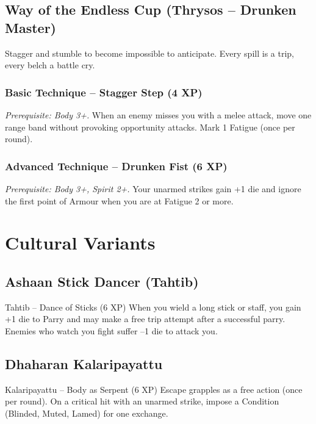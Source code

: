 \documentclass[9pt,a5paper]{extbook}
\begin{document}
\subsection{Way of the Endless Cup (Thrysos -- Drunken Master)}

Stagger and stumble to become impossible to anticipate. Every spill is a trip, every belch a battle cry.

\subsubsection*{Basic Technique -- Stagger Step (4 XP)}
\textit{Prerequisite: Body 3+.} When an enemy misses you with a melee attack, move one range band without provoking opportunity attacks. Mark 1 Fatigue (once per round).

\subsubsection*{Advanced Technique -- Drunken Fist (6 XP)}
\textit{Prerequisite: Body 3+, Spirit 2+.} Your unarmed strikes gain +1 die and ignore the first point of Armour when you are at Fatigue 2 or more.

\section{Cultural Variants}

\subsection{Ashaan Stick Dancer (Tahtib)}

\begin{talentbox}{Tahtib -- Dance of Sticks (6 XP)}
When you wield a long stick or staff, you gain +1 die to Parry and may make a free trip attempt after a successful parry. Enemies who watch you fight suffer --1 die to attack you.
\end{talentbox}

\subsection{Dhaharan Kalaripayattu}

\begin{talentbox}{Kalaripayattu -- Body as Serpent (6 XP)}
Escape grapples as a free action (once per round). On a critical hit with an unarmed strike, impose a Condition (Blinded, Muted, Lamed) for one exchange.
\end{talentbox}
\end{document}
